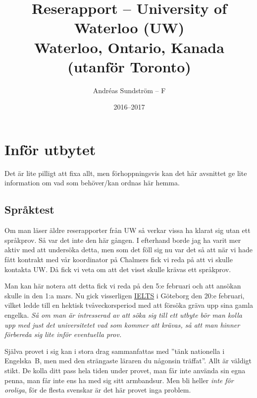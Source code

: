 \documentclass[11pt,a4paper, english, swedish]{article}
\begin{document}
\title{Reserapport -- University of Waterloo (UW) 
\\ \Large Waterloo, Ontario, Kanada \large(utanför Toronto)}
\author{Andréas Sundström -- F}
\date{2016--2017}

\maketitle

\addtocounter{section}{-1}
\section{Inför utbytet}
Det är lite pilligt att fixa allt, men förhoppningsvis kan det här
avsnittet ge lite information om vad som behöver/kan ordnas här hemma.

\subsection{Språktest}
Om man läser äldre reserapporter från UW så verkar vissa ha klarat sig
utan ett språkprov. Så var det inte den här gången. I efterhand borde
jag ha varit mer aktiv med att undersöka detta, men som det föll sig
nu var det så att när vi hade fått kontrakt med vår koordinator på
Chalmers fick vi reda på att vi skulle kontakta UW\footnotemark{}.
Då fick vi veta om att det visst skulle krävas ett språkprov. 

Man kan här notera att detta fick vi reda på den 5:e februari och att
ansökan skulle in den 1:a mars. Nu gick visserligen
\href{http://www.folkuniversitetet.se/Las-mer-om-sprak/Sprakexamina/IELTS/IELTS-Goteborg/}{IELTS}
i Göteborg den 20:e februari, vilket ledde till en hektisk
tvåveckorsperiod med att försöka gräva upp sina gamla
engelka. \emph{Så om man är intresserad av att söka sig till ett
  utbyte bör man kolla upp med just det universitetet vad som kommer
  att krävas, så att man hinner förbereda sig lite inför eventuella
  prov.}

Själva provet i sig kan i stora drag sammanfattas med ''tänk
nationella i Engelska~B, men med den strängaste läraren du någonsin
träffat''. Allt är väldigt stikt. De kolla ditt pass hela tiden
under provet, man får inte använda sin egna penna, man får inte ens ha
med sig sitt armbandsur. Men bli heller \emph{inte för oroliga}, för
de flesta svenskar är det här provet inga problem. 
\end{document}
